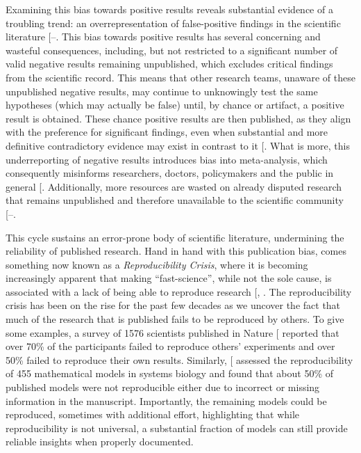 \documentclass[
  11pt,
  letterpaper,
]{scrreprt}
\begin{document}
Examining this bias towards positive results reveals substantial
evidence of a troubling trend: an overrepresentation of false-positive
findings in the scientific literature
{[}--\citeproc{ref-schneck2023Are}{328}{]}.
This bias towards positive results has several concerning and wasteful
consequences, including, but not restricted to a significant number of
valid negative results remaining unpublished, which excludes critical
findings from the scientific record. This means that other research
teams, unaware of these unpublished negative results, may continue to
unknowingly test the same hypotheses (which may actually be false)
until, by chance or artifact, a positive result is obtained. These
chance positive results are then published, as they align with the
preference for significant findings, even when substantial and more
definitive contradictory evidence may exist in contrast to it
{[}\citeproc{ref-carlson2012Understanding}{329}{]}. What is more, this
underreporting of negative results introduces bias into meta-analysis,
which consequently misinforms researchers, doctors, policymakers and the
public in general {[}\citeproc{ref-afonso2024Perils}{330}{]}.
Additionally, more resources are wasted on already disputed research
that remains unpublished and therefore unavailable to the scientific
community
{[}--\citeproc{ref-page2019Assessing}{334}{]}.

This cycle sustains an error-prone body of scientific literature,
undermining the reliability of published research. Hand in hand with
this publication bias, comes something now known as a
\emph{Reproducibility Crisis}, where it is becoming increasingly
apparent that making ``fast-science'', while not the sole cause, is
associated with a lack of being able to reproduce research
{[},
\citeproc{ref-leite2021Juggling}{336}{]}. The reproducibility crisis has
been on the rise for the past few decades as we uncover the fact that
much of the research that is published fails to be reproduced by others.
To give some examples, a survey of 1576 scientists published in Nature
{[}\citeproc{ref-baker2016500ScientistsLift}{337}{]} reported that over
70\% of the participants failed to reproduce others' experiments and
over 50\% failed to reproduce their own results. Similarly,
{[}\citeproc{ref-tiwari2021ReproducibilitySystemsBiology}{338}{]}
assessed the reproducibility of 455 mathematical models in systems
biology and found that about 50\% of published models were not
reproducible either due to incorrect or missing information in the
manuscript. Importantly, the remaining models could be reproduced,
sometimes with additional effort, highlighting that while
reproducibility is not universal, a substantial fraction of models can
still provide reliable insights when properly documented.
\end{document}
